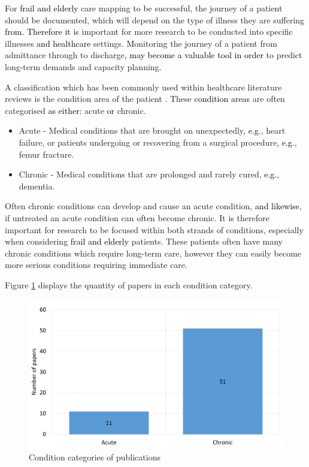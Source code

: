 \documentclass[../thesis.tex]{subfiles}
\begin{document}
For \textcolor{black}{frail and elderly} care mapping to be successful, the journey of a patient should be documented, which will depend on the type of illness they are suffering \textcolor{black}{from. Therefore it} is important for more research to be conducted into specific illnesses \textcolor{black}{and healthcare} settings. \textcolor{black}{M}onitoring the journey of a patient from admittance through to discharge\textcolor{black}{, may become a valuable tool in order} to predict long\textcolor{black}{-}term demands and capacity planning.

A classification which has been commonly used within healthcare literature reviews is the condition area of the patient \cite{Aspland,YZhang}. These \textcolor{black}{condition areas} are often categorised \textcolor{black}{as either:} acute \textcolor{black}{or} chronic.

\begin{itemize}
    \item Acute - Medical conditions that are brought on unexpectedly\textcolor{black}{, e.g.}, heart failure, or patients undergoing or recovering from a surgical procedure\textcolor{black}{, e.g.}, femur fracture.
    \item Chronic - Medical conditions that are prolonged and rarely cured, \textcolor{black}{e.g.}, dementia.
\end{itemize}

Often chronic conditions can develop and cause an acute condition, \textcolor{black}{and likewise}, if untreated an acute condition can often become chronic. It is therefore important for research to be focused within both strands of conditions, especially when considering \textcolor{black}{frail and elderly} patients. These patients often have many chronic conditions which require long-term care, however they can easily become more serious conditions requiring immediate care.

Figure \ref{fig:Condition} displays the quantity of papers in each condition category.

\begin{figure}[h!]
\centering
  \includegraphics[scale=0.3]{Chapter2/Figures/AcuteChronic.pdf} 
  \caption{Condition categories of publications}
  \label{fig:Condition}
\end{figure} 
\end{document}
